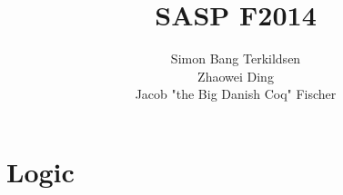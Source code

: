 \documentclass[citeauthoryear]{llncs} %
\title{SASP F2014}
\author{Simon Bang Terkildsen\\Zhaowei Ding\\Jacob "the Big Danish Coq" Fischer}
\institute{IT University of Copenhagen}
\theoremstyle{definition}
\theoremstyle{notation}
\begin{document}
\maketitle

\begin{abstract}

\end{abstract}







\section{Logic}








\end{document}
